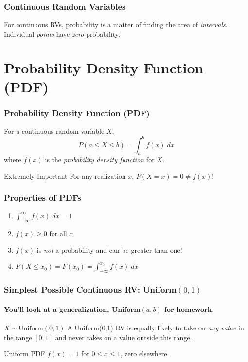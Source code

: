 
\begin{frame}
\frametitle{Continuous Random Variables}

For continuous RVs, probability is a matter of finding the area of \emph{intervals}. Individual \emph{points} have \emph{zero} probability.

\end{frame}



\section{Probability Density Function (PDF)}

\begin{frame}
\frametitle{Probability Density Function (PDF)}
For a continuous random variable $X$, 
	$$P(a \leq X \leq b) = \int_a^b f(x) \; dx$$
where $f(x)$ is the \emph{probability density function} for $X$. 
\vspace{2em}

\begin{alertblock}{Extremely Important}
For any realization $x$, $P(X=x) = 0 \neq f(x)$!
\end{alertblock}
\end{frame}
\begin{frame}
\frametitle{Properties of PDFs}
\begin{enumerate}
\item $\int_{-\infty}^\infty f(x) \; dx = 1$ 
\item $f(x) \geq 0$ for all $x$
\item $f(x)$ is \emph{not} a probability and can be greater than one!
\item $P(X\leq x_0) = F(x_0) = \int_{-\infty}^{x_0} f(x) \; dx $
\end{enumerate}
\end{frame}
\begin{frame}
\frametitle{Simplest Possible Continuous RV: Uniform$(0,1)$}
\framesubtitle{You'll look at a generalization, Uniform$(a,b)$ for homework.}

\begin{block}{$X \sim \mbox{Uniform}(0,1)$}
A Uniform(0,1) RV is equally likely to take on \emph{any value} in the range $[0,1]$ and never takes on a value outside this range.
\end{block}

\begin{block}{Uniform PDF}
$f(x) = 1$ for $0\leq x \leq 1$, zero elsewhere.
\end{block}


\end{frame}


